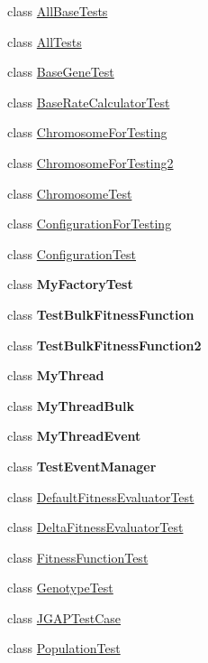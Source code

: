 \begin{DoxyCompactItemize}
\item 
class \hyperlink{classorg_1_1jgap_1_1_all_base_tests}{All\-Base\-Tests}
\item 
class \hyperlink{classorg_1_1jgap_1_1_all_tests}{All\-Tests}
\item 
class \hyperlink{classorg_1_1jgap_1_1_base_gene_test}{Base\-Gene\-Test}
\item 
class \hyperlink{classorg_1_1jgap_1_1_base_rate_calculator_test}{Base\-Rate\-Calculator\-Test}
\item 
class \hyperlink{classorg_1_1jgap_1_1_chromosome_for_testing}{Chromosome\-For\-Testing}
\item 
class \hyperlink{classorg_1_1jgap_1_1_chromosome_for_testing2}{Chromosome\-For\-Testing2}
\item 
class \hyperlink{classorg_1_1jgap_1_1_chromosome_test}{Chromosome\-Test}
\item 
class \hyperlink{classorg_1_1jgap_1_1_configuration_for_testing}{Configuration\-For\-Testing}
\item 
class \hyperlink{classorg_1_1jgap_1_1_configuration_test}{Configuration\-Test}
\item 
class {\bfseries My\-Factory\-Test}
\item 
class {\bfseries Test\-Bulk\-Fitness\-Function}
\item 
class {\bfseries Test\-Bulk\-Fitness\-Function2}
\item 
class {\bfseries My\-Thread}
\item 
class {\bfseries My\-Thread\-Bulk}
\item 
class {\bfseries My\-Thread\-Event}
\item 
class {\bfseries Test\-Event\-Manager}
\item 
class \hyperlink{classorg_1_1jgap_1_1_default_fitness_evaluator_test}{Default\-Fitness\-Evaluator\-Test}
\item 
class \hyperlink{classorg_1_1jgap_1_1_delta_fitness_evaluator_test}{Delta\-Fitness\-Evaluator\-Test}
\item 
class \hyperlink{classorg_1_1jgap_1_1_fitness_function_test}{Fitness\-Function\-Test}
\item 
class \hyperlink{classorg_1_1jgap_1_1_genotype_test}{Genotype\-Test}
\item 
class \hyperlink{classorg_1_1jgap_1_1_j_g_a_p_test_case}{J\-G\-A\-P\-Test\-Case}
\item 
class \hyperlink{classorg_1_1jgap_1_1_population_test}{Population\-Test}
\end{DoxyCompactItemize}


